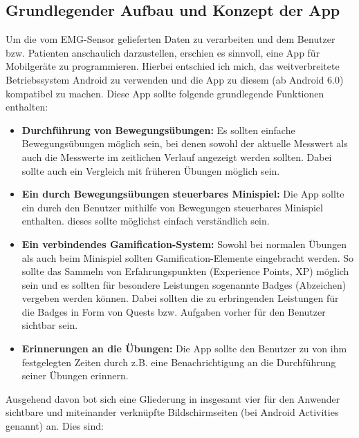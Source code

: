 \subsection{Grundlegender Aufbau und Konzept der App}
Um die vom EMG-Sensor gelieferten Daten zu verarbeiten und dem Benutzer bzw. Patienten anschaulich darzustellen, erschien es sinnvoll, eine App für Mobilgeräte zu programmieren. Hierbei entschied ich mich, das weitverbreitete Betriebssystem Android zu verwenden und die App zu diesem (ab Android 6.0) kompatibel zu machen. Diese App sollte folgende grundlegende Funktionen enthalten:
\begin{itemize}
	\item \textbf{Durchführung von Bewegungsübungen:} Es sollten einfache Bewegungsübungen möglich sein, bei denen sowohl der aktuelle Messwert als auch die Messwerte im zeitlichen Verlauf angezeigt werden sollten. Dabei sollte auch ein Vergleich mit früheren Übungen möglich sein.
	\item \textbf{Ein durch Bewegungsübungen steuerbares Minispiel:} Die App sollte ein durch den Benutzer mithilfe von Bewegungen steuerbares Minispiel enthalten. dieses sollte möglichst einfach verständlich sein.
	\item \textbf{Ein verbindendes Gamification-System:} Sowohl bei normalen Übungen als auch beim Minispiel sollten Gamification-Elemente eingebracht werden. So sollte das Sammeln von Erfahrungspunkten (Experience Points, XP) möglich sein und es sollten für besondere Leistungen sogenannte Badges (Abzeichen) vergeben werden können. Dabei sollten die zu erbringenden Leistungen für die Badges in Form von Quests bzw. Aufgaben vorher für den Benutzer sichtbar sein.
	\item \textbf{Erinnerungen an die Übungen:} Die App sollte den Benutzer zu von ihm festgelegten Zeiten durch z.B. eine Benachrichtigung an die Durchführung seiner Übungen erinnern.
\end{itemize}
Ausgehend davon bot sich eine Gliederung in insgesamt vier für den Anwender sichtbare und miteinander verknüpfte Bildschirmseiten (bei Android Activities\cite{Src:AndroidKuenneth} genannt) an. Dies sind:
